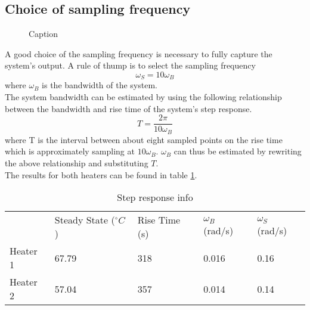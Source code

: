 \subsection{Choice of sampling frequency}

\begin{figure}[ht]
    \centering
    
    \caption{Caption}
    \label{fig:my_label}
\end{figure}

A good choice of the sampling frequency is necessary to fully capture the system's output.
A rule of thump is to select the sampling frequency 
$$
\omega_S = 10\omega_B
$$
where $\omega_B$ is the bandwidth of the system. \\

\noindent The system bandwidth can be estimated by using the following relationship between the bandwidth and rise time of the system's step response.
$$
 T = \frac{2\pi}{10\omega_B}
$$
where T is the interval between about eight sampled points on the rise time which is approximately sampling at $10\omega_B$. $\omega_B$ can thus be estimated by rewriting the above relationship and substituting $T$. \\

\noindent The results for both heaters can be found in table \ref{Tab:stepInfo}.

\begin{table}[ht]
\centering
\begin{tabular}{lllll}
 & Steady State ($^{\circ}C$) & Rise Time (s) & $\omega_B$ (rad/s) & $\omega_S$ (rad/s) \\ \cline{2-5} 
Heater 1 & 67.79 & 318 & 0.016 & 0.16 \\
Heater 2 & 57.04 & 357 & 0.014 & 0.14
\end{tabular}
\caption{Step response info}
\label{Tab:stepInfo}
\end{table}